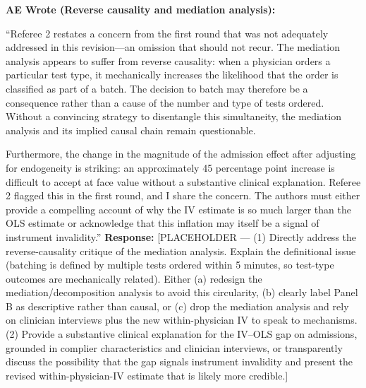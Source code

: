 \documentclass[11pt]{article}
\newenvironment{quote2}
{ \bigskip
\noindent
         \small\em
         \baselineskip=14pt
}
\newcommand{\1}{\hbox{\rm 1\kern-.35em 1}}
\begin{document}
\begin{quote2}
\textbf{AE Wrote (Reverse causality and mediation analysis):}

\noindent ``Referee 2 restates a concern from the first round that was not adequately addressed in this revision---an omission that should not recur. The mediation analysis appears to suffer from reverse causality: when a physician orders a particular test type, it mechanically increases the likelihood that the order is classified as part of a batch. The decision to batch may therefore be a consequence rather than a cause of the number and type of tests ordered. Without a convincing strategy to disentangle this simultaneity, the mediation analysis and its implied causal chain remain questionable.

Furthermore, the change in the magnitude of the admission effect after adjusting for endogeneity is striking: an approximately 45 percentage point increase is difficult to accept at face value without a substantive clinical explanation. Referee 2 flagged this in the first round, and I share the concern. The authors must either provide a compelling account of why the IV estimate is so much larger than the OLS estimate or acknowledge that this inflation may itself be a signal of instrument invalidity.''
\end{quote2}

\noindent\textbf{Response:} \color{blue}[PLACEHOLDER --- (1) Directly address the reverse-causality critique of the mediation analysis. Explain the definitional issue (batching is defined by multiple tests ordered within 5 minutes, so test-type outcomes are mechanically related). Either (a) redesign the mediation/decomposition analysis to avoid this circularity, (b) clearly label Panel B as descriptive rather than causal, or (c) drop the mediation analysis and rely on clinician interviews plus the new within-physician IV to speak to mechanisms. (2) Provide a substantive clinical explanation for the IV--OLS gap on admissions, grounded in complier characteristics and clinician interviews, or transparently discuss the possibility that the gap signals instrument invalidity and present the revised within-physician-IV estimate that is likely more credible.]
\color{black}
\end{document}
